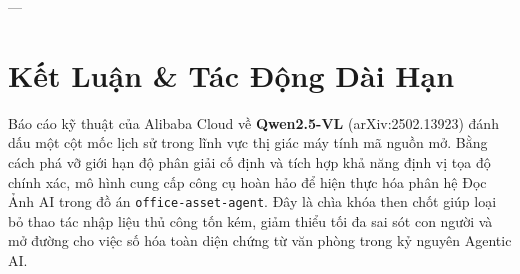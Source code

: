 \documentclass[11pt,a4paper]{article}
\begin{document}
---

\section{Kết Luận \& Tác Động Dài Hạn}

Báo cáo kỹ thuật của Alibaba Cloud về \textbf{Qwen2.5-VL} (arXiv:2502.13923) đánh dấu một cột mốc lịch sử trong lĩnh vực thị giác máy tính mã nguồn mở. Bằng cách phá vỡ giới hạn độ phân giải cố định và tích hợp khả năng định vị tọa độ chính xác, mô hình cung cấp công cụ hoàn hảo để hiện thực hóa phân hệ Đọc Ảnh AI trong đồ án \texttt{office-asset-agent}. Đây là chìa khóa then chốt giúp loại bỏ thao tác nhập liệu thủ công tốn kém, giảm thiểu tối đa sai sót con người và mở đường cho việc số hóa toàn diện chứng từ văn phòng trong kỷ nguyên Agentic AI.
\end{document}
